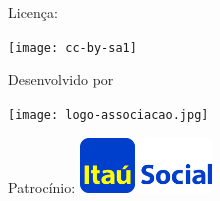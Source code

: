 \begin{figure}[b]
\begin{minipage}[l]{5cm}
\centering

{\large Licença:}

  \texttt{[image: cc-by-sa1]}
\end{minipage}\hfill
\begin{minipage}[c]{5cm}
\centering
{\large Desenvolvido por}

\texttt{[image: logo-associacao.jpg]}
\end{minipage}
\begin{minipage}[r]{5cm}
\centering

{\large Patrocínio:}
  \vspace{1em}
  \includegraphics[width=3.5cm]{itau}
\end{minipage}
\end{figure}

\mainmatter

